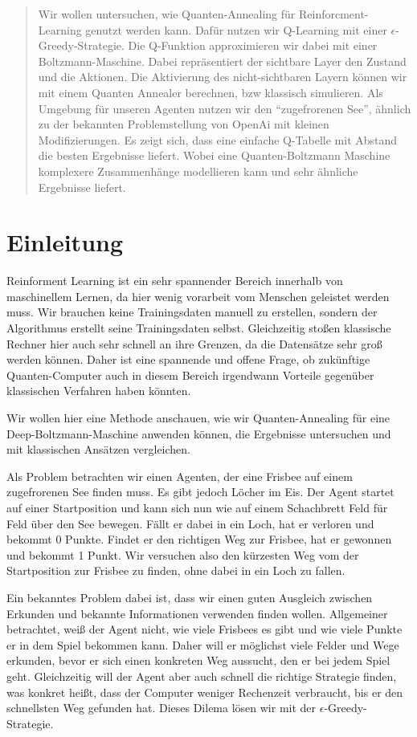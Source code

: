 \begin{abstract}
Wir wollen untersuchen, wie Quanten-Annealing für Reinforcment-Learning genutzt werden kann. Dafür nutzen wir Q-Learning mit einer $\epsilon$-Greedy-Strategie. Die Q-Funktion approximieren wir dabei mit einer Boltzmann-Maschine. Dabei repräsentiert der sichtbare Layer den Zustand und die Aktionen. Die Aktivierung des nicht-sichtbaren Layern können wir mit einem Quanten Annealer berechnen, bzw klassisch simulieren. Als Umgebung für unseren Agenten nutzen wir den ``zugefrorenen See'', ähnlich zu der bekannten Problemstellung von OpenAi mit kleinen Modifizierungen. Es zeigt sich, dass eine einfache Q-Tabelle mit Abstand die besten Ergebnisse liefert. Wobei eine Quanten-Boltzmann Maschine komplexere Zusammenhänge modellieren kann und sehr ähnliche Ergebnisse liefert.
\end{abstract}

\section{Einleitung }
\label{sec:int}

Reinforment Learning ist ein sehr spannender Bereich innerhalb von maschinellem Lernen, da hier wenig vorarbeit vom Menschen geleistet werden muss. Wir brauchen keine Trainingsdaten manuell zu erstellen, sondern der Algorithmus erstellt seine Trainingsdaten selbst. Gleichzeitig stoßen klassische Rechner hier auch sehr schnell an ihre Grenzen, da die Datensätze sehr groß werden können. Daher ist eine spannende und offene Frage, ob zukünftige Quanten-Computer auch in diesem Bereich irgendwann Vorteile gegenüber klassischen Verfahren haben könnten.

Wir wollen hier eine Methode anschauen, wie wir Quanten-Annealing für eine Deep-Boltzmann-Maschine anwenden können, die Ergebnisse untersuchen und mit klassischen Ansätzen vergleichen.

Als Problem betrachten wir einen Agenten, der eine Frisbee auf einem zugefrorenen See finden muss. Es gibt jedoch Löcher im Eis. Der Agent startet auf einer Startposition und kann sich nun wie auf einem Schachbrett Feld für Feld über den See bewegen. Fällt er dabei in ein Loch, hat er verloren und bekommt 0 Punkte. Findet er den richtigen Weg zur Frisbee, hat er gewonnen und bekommt 1 Punkt. Wir versuchen also den kürzesten Weg vom der Startposition zur Frisbee zu finden, ohne dabei in ein Loch zu fallen.

Ein bekanntes Problem dabei ist, dass wir einen guten Ausgleich zwischen Erkunden und bekannte Informationen verwenden finden wollen. Allgemeiner betrachtet, weiß der Agent nicht, wie viele Frisbees es gibt und wie viele Punkte er in dem Spiel bekommen kann. Daher will er möglichst viele Felder und Wege erkunden, bevor er sich einen konkreten Weg aussucht, den er bei jedem Spiel geht. Gleichzeitig will der Agent aber auch schnell die richtige Strategie finden, was konkret heißt, dass der Computer weniger Rechenzeit verbraucht, bis er den schnellsten Weg gefunden hat. Dieses Dilema lösen wir mit der $\epsilon$-Greedy-Strategie.

